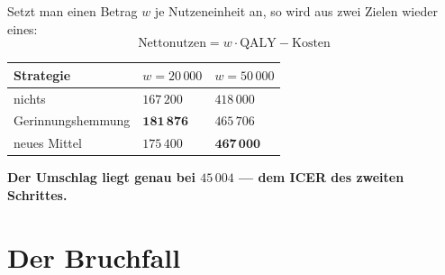\begin{merksatz}
Setzt man einen Betrag $w$ je Nutzeneinheit an, so wird aus zwei Zielen wieder eines:
\[ \text{Nettonutzen} = w\cdot\text{QALY} - \text{Kosten} \]

\begin{center}
{\small
\renewcommand{\arraystretch}{1.5}
\begin{tabular}{@{}P{3.6cm}P{2.4cm}P{2.4cm}@{}}
\toprule
\textbf{Strategie} & $w = 20\,000$ & $w = 50\,000$\\
\midrule
nichts & $167\,200$ & $418\,000$\\
Gerinnungshemmung & $\mathbf{181\,876}$ & $465\,706$\\
neues Mittel & $175\,400$ & $\mathbf{467\,000}$\\
\bottomrule
\end{tabular}}
\end{center}

\begin{center}
\begin{minipage}{0.9\textwidth}
\textbf{Der Umschlag liegt genau bei $45\,004$ --- dem ICER des zweiten Schrittes.}
\end{minipage}
\end{center}

\begin{center}
\begin{minipage}{0.88\textwidth}
\end{minipage}
\end{center}
\end{merksatz}

\section{Der Bruchfall}

